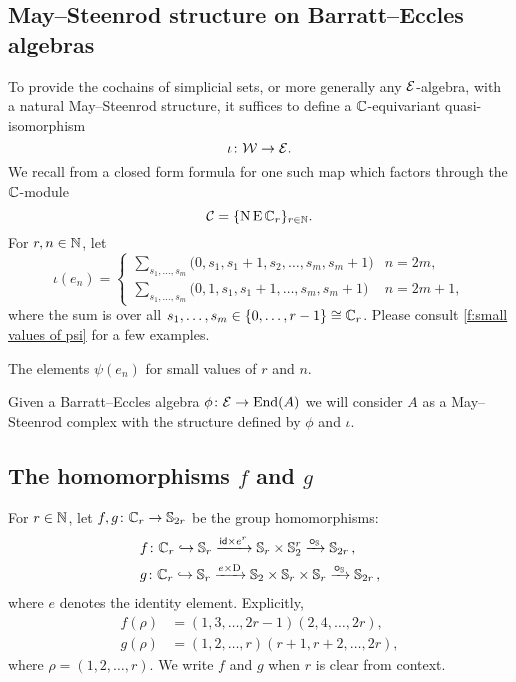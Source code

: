\subsection{May--Steenrod structure on Barratt--Eccles algebras}\label{ss:may-steenrod on barratt-eccles}

To provide the cochains of simplicial sets, or more generally any $\mathcal{E}$-algebra, with a natural May--Steenrod structure, it suffices to define a $\mathbb{C}$-equivariant quasi-isomorphism
\[
\iota \colon \mathcal{W} \to \mathcal{E}.
\]
We recall from \cite{medina2021may_st} a closed form formula for one such map which factors through the $\mathbb{C}$-module
\[
\mathcal{C} = \{\operatorname{N}\operatorname{E}\mathbb{C}_r\}_{r\in\mathbb{N}}.
\]
For $r,n\in\mathbb{N}$, let
\begin{equation*}
	\iota(e_{n}) =
	\begin{cases}
		\displaystyle{\sum_{s_1, \dots, s_m}} \big(0, {s_1}, {s_1+1}, {s_2}, \dots, {s_{m}}, {s_{m}+1} \big) & n = 2m, \\
		\displaystyle{\sum_{s_1, \dots, s_m}} \big(0, 1, {s_1}, {s_1+1}, \dots, {s_{m}}, {s_{m}+1} \big) & n = 2m+1,
	\end{cases}
\end{equation*}
where the sum is over all $s_1, \dots, s_m \in \{0, \dots, r-1\} \cong \mathbb{C}_r$.
Please consult \cref{f:small values of psi} for a few examples.

\begin{table}
	\centering
	
	\caption{The elements $\psi(e_n)$ for small values of $r$ and $n$.}
	\label{f:small values of psi}
\end{table}

Given a Barratt--Eccles algebra $\phi \colon \mathcal{E} \to \mathrm{End}(A)$ we will consider $A$ as a May--Steenrod complex with the structure defined by $\phi$ and $\iota$.

\subsection{The homomorphisms $f$ and $g$}\label{ss:f and g}

For $r \in \mathbb{N}$, let $f,g \colon \mathbb{C}_r \to \mathbb{S}_{2r}$ be the group homomorphisms:
\[
\begin{split}
	&f \colon \mathbb{C}_r \hookrightarrow \mathbb{S}_r \xrightarrow{\mathsf{id} \times e^r} \mathbb{S}_r \times \mathbb{S}_2^r \xrightarrow{\bm{\circ}_{\mathbb{S}}} \mathbb{S}_{2r}\,, \\
	&g \colon \mathbb{C}_r \hookrightarrow \mathbb{S}_r \xrightarrow{e \times \mathrm{D}} \mathbb{S}_2 \times \mathbb{S}_r \times \mathbb{S}_r \xrightarrow{\bm{\circ}_{\mathbb{S}}} \mathbb{S}_{2r}\,,
\end{split}
\]
where $e$ denotes the identity element.
Explicitly,
\begin{align*}
	f(\rho) &= (1,3,\dots,2r-1)(2,4,\dots,2r), \\
	g(\rho) &= (1,2,\dots,r)(r+1,r+2,\dots,2r),
\end{align*}
where $\rho = (1,2,\dots,r)$.
We write $f$ and $g$ when $r$ is clear from context.

